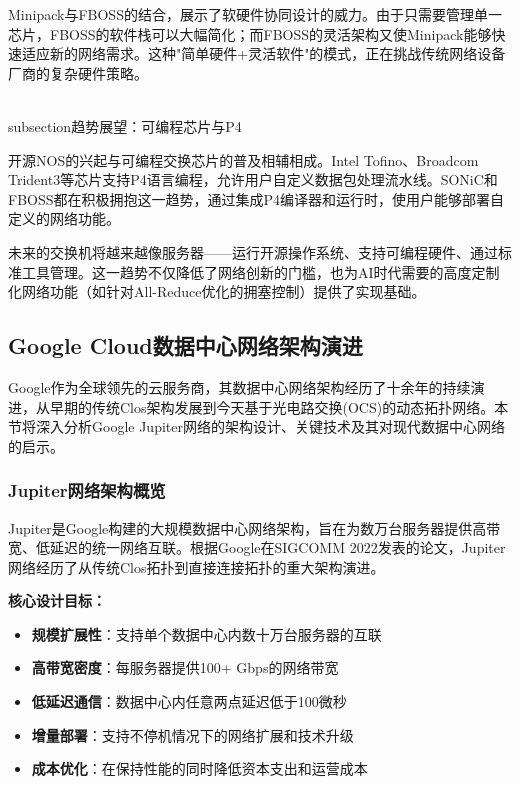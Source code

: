 Minipack与FBOSS的结合，展示了软硬件协同设计的威力。由于只需要管理单一芯片，FBOSS的软件栈可以大幅简化；而FBOSS的灵活架构又使Minipack能够快速适应新的网络需求。这种"简单硬件+灵活软件"的模式，正在挑战传统网络设备厂商的复杂硬件策略。

\\subsection{趋势展望：可编程芯片与P4}

开源NOS的兴起与可编程交换芯片的普及相辅相成。Intel Tofino、Broadcom Trident3等芯片支持P4语言编程，允许用户自定义数据包处理流水线。SONiC和FBOSS都在积极拥抱这一趋势，通过集成P4编译器和运行时，使用户能够部署自定义的网络功能。

未来的交换机将越来越像服务器——运行开源操作系统、支持可编程硬件、通过标准工具管理。这一趋势不仅降低了网络创新的门槛，也为AI时代需要的高度定制化网络功能（如针对All-Reduce优化的拥塞控制）提供了实现基础。
\subsection{Google Cloud数据中心网络架构演进}

Google作为全球领先的云服务商，其数据中心网络架构经历了十余年的持续演进，从早期的传统Clos架构发展到今天基于光电路交换(OCS)的动态拓扑网络。本节将深入分析Google Jupiter网络的架构设计、关键技术及其对现代数据中心网络的启示。

\subsubsection{Jupiter网络架构概览}

Jupiter是Google构建的大规模数据中心网络架构，旨在为数万台服务器提供高带宽、低延迟的统一网络互联。根据Google在SIGCOMM 2022发表的论文\cite{jupiter2022}，Jupiter网络经历了从传统Clos拓扑到直接连接拓扑的重大架构演进。

\textbf{核心设计目标：}
\begin{itemize}
    \item \textbf{规模扩展性}：支持单个数据中心内数十万台服务器的互联
    \item \textbf{高带宽密度}：每服务器提供100+ Gbps的网络带宽
    \item \textbf{低延迟通信}：数据中心内任意两点延迟低于100微秒
    \item \textbf{增量部署}：支持不停机情况下的网络扩展和技术升级
    \item \textbf{成本优化}：在保持性能的同时降低资本支出和运营成本
\end{itemize}

